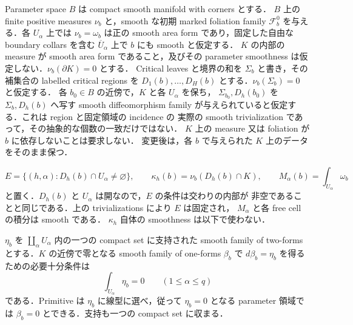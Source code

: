 Parameter space $B$ は compact smooth manifold with corners とする．
$B$ 上の finite positive measures $\nu_b$ と，smooth な初期 marked
foliation family $\mathcal F_b^0$ を与える．各 $U_\alpha$ 上では
$\nu_b=\omega_b$ は正の smooth area form であり，固定した自由な boundary collars
を含む $\overline U_\alpha$ 上で $b$ にも smooth と仮定する．
$K$ の内部の measure が smooth area form であること，及びその parameter smoothness
は仮定しない．$\nu_b(\partial K)=0$ とする．
Critical leaves と境界の和を $\Sigma_b$ と書き，その補集合の labelled critical
regions を $D_1(b),\ldots,D_H(b)$ とする．$\nu_b(\Sigma_b)=0$ と仮定する．
各 $b_0\in B$ の近傍で，$K$ と各 $U_\alpha$ を保ち，
$\Sigma_{b_0},D_h(b_0)$ を $\Sigma_b,D_h(b)$ へ写す smooth diffeomorphism family
が与えられていると仮定する．これは region と固定領域の incidence の
実際の smooth trivialization であって，その抽象的な個数の一致だけではない．
$K$ 上の measure 又は foliation が $b$ に依存しないことは要求しない．
変更後は，各 $b$ で与えられた $K$ 上のデータをそのまま保つ．

\[
 E=\{(h,\alpha):D_h(b)\cap U_\alpha\ne\varnothing\},\qquad
 \kappa_h(b)=\nu_b(D_h(b)\cap K),\qquad
 M_\alpha(b)=\int_{U_\alpha}\omega_b
\]
と置く．$D_h(b)$ と $U_\alpha$ は開なので，$E$ の条件は交わりの内部が
非空であることと同じである．上の trivializations により $E$ は固定され，
$M_\alpha$ と各 free cell の積分は smooth である．
$\kappa_h$ 自体の smoothness は以下で使わない．

\begin{lemma}
\label{ng8:componentwise-primitive}
$\eta_b$ を $\coprod_\alpha U_\alpha$ 内の一つの compact set に支持された
smooth family of two-forms とする．$K$ の近傍で零となる smooth family of
one-forms $\beta_b$ で $d\beta_b=\eta_b$ を得るための必要十分条件は
\[
 \int_{U_\alpha}\eta_b=0\qquad(1\le\alpha\le q)
\]
である．Primitive は $\eta_b$ に線型に選べ，従って $\eta_b=0$ となる
parameter 領域では $\beta_b=0$ とできる．支持も一つの compact set に収まる．
\end{lemma}

